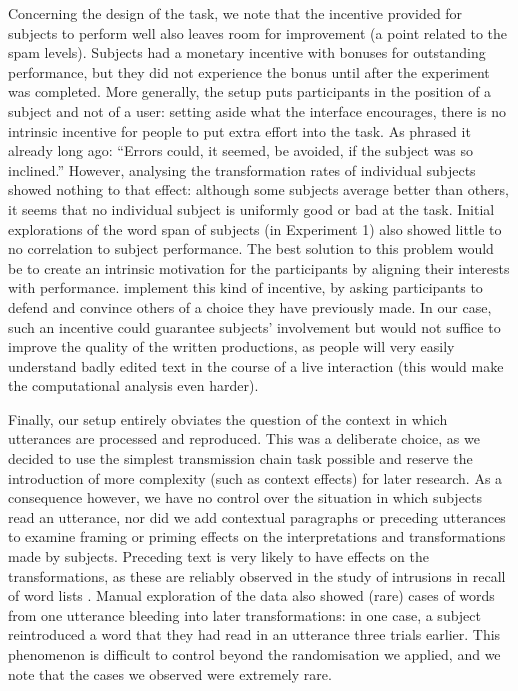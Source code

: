Concerning the design of the task, we note that the incentive provided
for subjects to perform well also leaves room for improvement (a point
related to the spam levels). Subjects had a monetary incentive with
bonuses for outstanding performance, but they did not experience the
bonus until after the experiment was completed. More generally, the
setup puts participants in the position of a subject and not of a user:
setting aside what the interface encourages, there is no intrinsic
incentive for people to put extra effort into the task. As
\textcite{gauld_experiments_1967} phrased it already long ago:
\enquote{Errors could, it seemed, be avoided, if the subject was so
inclined.} However, analysing the transformation rates of individual
subjects showed nothing to that effect: although some subjects average
better than others, it seems that no individual subject is uniformly
good or bad at the task. Initial explorations of the word span of
subjects (in Experiment 1) also showed little to no correlation to
subject performance. The best solution to this problem would be to
create an intrinsic motivation for the participants by aligning their
interests with performance. \textcite{claidiere_argumentation_2017}
implement this kind of incentive, by asking participants to defend and
convince others of a choice they have previously made. In our case, such
an incentive could guarantee subjects' involvement but would not suffice
to improve the quality of the written productions, as people will very
easily understand badly edited text in the course of a live interaction
(this would make the computational analysis even harder).

Finally, our setup entirely obviates the question of the context in
which utterances are processed and reproduced. This was a deliberate
choice, as we decided to use the simplest transmission chain task
possible and reserve the introduction of more complexity (such as
context effects) for later research. As a consequence however, we have
no control over the situation in which subjects read an utterance, nor
did we add contextual paragraphs or preceding utterances to examine
framing or priming effects on the interpretations and transformations
made by subjects. Preceding text is very likely to have effects on the
transformations, as these are reliably observed in the study of
intrusions in recall of word lists \autocite{zaromb_temporal_2006}.
Manual exploration of the data also showed (rare) cases of words from
one utterance bleeding into later transformations: in one case, a
subject reintroduced a word that they had read in an utterance three
trials earlier. This phenomenon is difficult to control beyond the
randomisation we applied, and we note that the cases we observed were
extremely rare.

